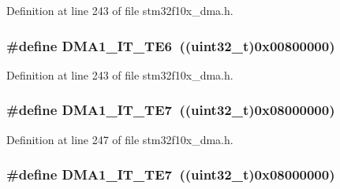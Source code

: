 Definition at line 243 of file stm32f10x\+\_\+dma.\+h.

\subsubsection[{\texorpdfstring{D\+M\+A1\+\_\+\+I\+T\+\_\+\+T\+E6}{DMA1_IT_TE6}}]{\setlength{\rightskip}{0pt plus 5cm}\#define D\+M\+A1\+\_\+\+I\+T\+\_\+\+T\+E6~(({\bf uint32\+\_\+t})0x00800000)}\hypertarget{group___d_m_a__interrupts__definition_ga2bbf515c1154a5ad359cbd0ace724e64}{}\label{group___d_m_a__interrupts__definition_ga2bbf515c1154a5ad359cbd0ace724e64}


Definition at line 243 of file stm32f10x\+\_\+dma.\+h.

\subsubsection[{\texorpdfstring{D\+M\+A1\+\_\+\+I\+T\+\_\+\+T\+E7}{DMA1_IT_TE7}}]{\setlength{\rightskip}{0pt plus 5cm}\#define D\+M\+A1\+\_\+\+I\+T\+\_\+\+T\+E7~(({\bf uint32\+\_\+t})0x08000000)}\hypertarget{group___d_m_a__interrupts__definition_ga1261e2bfa461a8097603b7737eb7698c}{}\label{group___d_m_a__interrupts__definition_ga1261e2bfa461a8097603b7737eb7698c}


Definition at line 247 of file stm32f10x\+\_\+dma.\+h.

\subsubsection[{\texorpdfstring{D\+M\+A1\+\_\+\+I\+T\+\_\+\+T\+E7}{DMA1_IT_TE7}}]{\setlength{\rightskip}{0pt plus 5cm}\#define D\+M\+A1\+\_\+\+I\+T\+\_\+\+T\+E7~(({\bf uint32\+\_\+t})0x08000000)}\hypertarget{group___d_m_a__interrupts__definition_ga1261e2bfa461a8097603b7737eb7698c}{}\label{group___d_m_a__interrupts__definition_ga1261e2bfa461a8097603b7737eb7698c}


